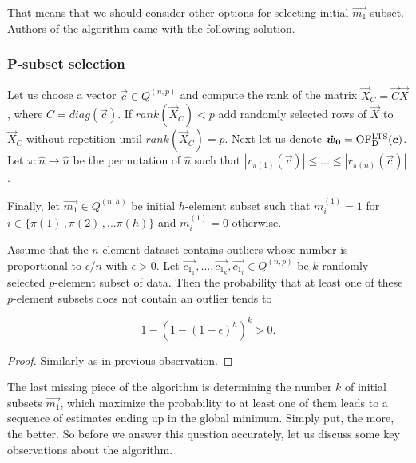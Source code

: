 That means that we should consider other options for selecting initial $\vec{m_1}$ subset.
Authors of the algorithm came with the following solution.



\subsubsection*{P-subset selection} \label{section:random:p:samples}

Let us choose a vector $\vec{c} \in Q^{(n, p)}$ and compute the rank of the matrix $\vec{X}_{C} = \vec{C}\vec{X}$, where $C = diag(\vec{c})$. If $rank(\vec{X}_{C}) < p$ add randomly selected rows of $\vec{X}$ to $\vec{X}_{C}$ without repetition until $rank(\vec{X}_{C}) = p$. 
Next let us denote $\boldsymbol{\hat{w}_0} = \operatorname{OF^{LTS}_D}(\boldsymbol{c})$. Let
$\pi: \hat{n} \rightarrow \hat{n}$ be the permutation of $\hat{n}$ such that 
$|r_{\pi(1)}(\vec{c})| \leq \ldots \leq |r_{\pi(n)}(\vec{c})|$.

 Finally, let $\vec{m_1} \in Q^{(n,h)}$ be initial $h$-element subset such that $m^{(1)}_i = 1$ for $i \in \{{\pi(1)\,, \pi(2)\,,... \pi(h)\}}$ and  $m^{(1)}_i = 0$  otherwise.
\begin{observation} \label{prandomsamples}
    Assume that the $n$-element dataset contains outliers whose number is proportional to $\epsilon / n$ with $\epsilon > 0$. Let $\vec{c_{1_1}}, \ldots ,\vec{c_{1_k}}, \vec{c_{1_i}} \in Q^{(n, p)} $ be $k$ randomly selected $p$-element subset of data. Then the probability that at least one of these $p$-element subsets does not contain an outlier tends to

\begin{equation}
    1-(1-(1-\epsilon)^h)^k  > 0.
\end{equation}
\end{observation}

\begin{proof}
    Similarly as in previous observation.
\end{proof}

The last missing piece of the algorithm is determining the number $k$ of initial subsets $\vec{m_1}$, which maximize the probability to at least one of them leads to a sequence of estimates ending up in the global minimum. Simply put, the more, the better. So before we answer this question accurately, let us discuss some key observations about the algorithm.

